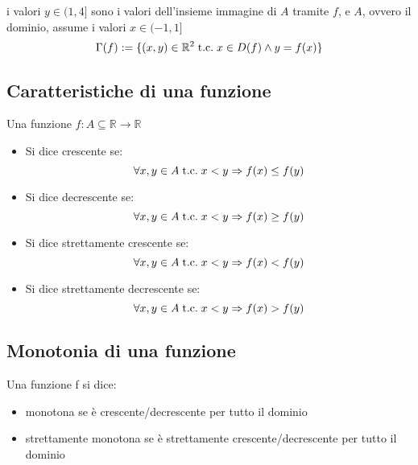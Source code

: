 \documentclass[a4paper,12pt]{article}
\begin{document}
	 \begin{center}
	 \end{center}
	 i valori $y \in (1, 4]$ sono i valori dell'insieme immagine di $A$ tramite $f$, e $A$, ovvero il dominio, assume i valori $x \in (-1, 1]$
	 \[\Gamma(f) := \{(x,y) \in \mathbb{R}^2 \;\text{t.c.}\; x \in D(f) \wedge y = f(x)\}\]
	 
	 \subsection{Caratteristiche di una funzione}
	 Una funzione $f: A \subseteq \mathbb{R} \longrightarrow \mathbb{R}$
	 
	 \begin{itemize}
	 	\item Si dice crescente se:
	 	\[\forall x,y \in A \;\text{t.c.}\; x < y \Rightarrow f(x) \leq f(y)\]
	 	\item Si dice decrescente se:
	 	\[\forall x,y \in A \;\text{t.c.}\; x < y \Rightarrow f(x) \geq f(y)\]
	 	\item Si dice strettamente crescente se:
	 	\[\forall x,y \in A \;\text{t.c.}\; x < y \Rightarrow f(x) < f(y)\]
	 	\item Si dice strettamente decrescente se:
	 	\[\forall x,y \in A \;\text{t.c.}\; x < y \Rightarrow f(x) > f(y)\]
	 \end{itemize}
	 
	 \subsection{Monotonia di una funzione}
	 Una funzione f si dice:
	 \begin{itemize}
	 	\item monotona se è crescente/decrescente per tutto il dominio
	 	\item strettamente monotona se è strettamente crescente/decrescente per tutto il dominio
	 \end{itemize}
	 
\end{document}
